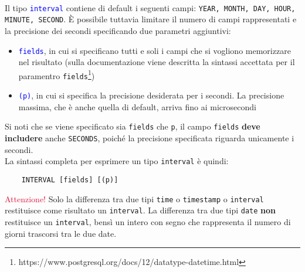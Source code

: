 \documentclass[12pt,a4paper]{book}
\begin{document}
	\paragraph{}Il tipo \textcolor{blue}{\texttt{interval}} contiene di default i seguenti campi: \texttt{YEAR, MONTH, DAY, HOUR, MINUTE, SECOND}. È possibile tuttavia limitare il numero di campi rappresentati e la precisione dei secondi specificando due parametri aggiuntivi:
	\begin{itemize}
		\item \textcolor{blue}{\texttt{fields}}, in cui si specificano tutti e soli i campi che si vogliono memorizzare nel risultato (sulla documentazione viene descritta la sintassi accettata per il paramentro \texttt{fields}\footnote{https://www.postgresql.org/docs/12/datatype-datetime.html})
		\item \textcolor{blue}{\texttt{(p)}}, in cui si specifica la precisione desiderata per i secondi. La precisione massima, che è anche quella di default, arriva fino ai microsecondi
	\end{itemize}
	Si noti che se viene specificato sia \texttt{fields} che \texttt{p}, il campo \texttt{fields} \textbf{deve includere} anche \texttt{SECONDS}, poiché la precisione specificata riguarda unicamente i secondi.\\
	La sintassi completa per esprimere un tipo \texttt{interval} è quindi:
	\begin{lstlisting}
	INTERVAL [fields] [(p)]
	\end{lstlisting}
	\textcolor{crimson}{Attenzione!} Solo la differenza tra due tipi \texttt{time} o \texttt{timestamp} o \texttt{interval} restituisce come risultato un \texttt{interval}. La differenza tra due tipi \texttt{date} \textbf{non} restituisce un \texttt{interval}, bensì un intero con segno che rappresenta il numero di giorni trascorsi tra le due date.
\end{document}
